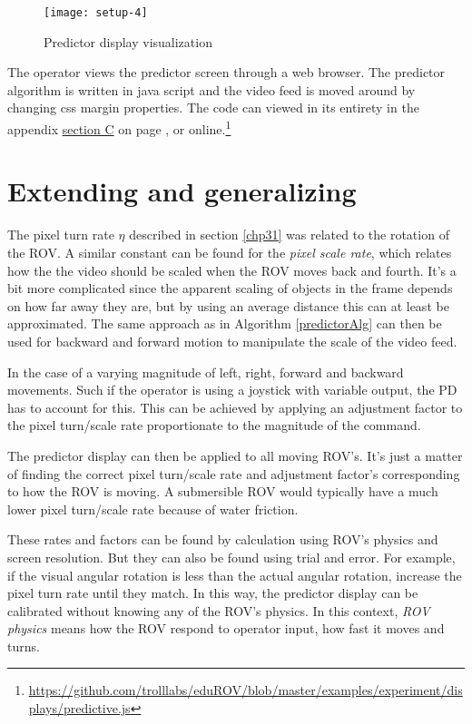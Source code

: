 \begin{figure}[h!]
    \centering
    \texttt{[image: setup-4]}
    \caption{Predictor display visualization}
    \label{predictorvis}
\end{figure}

\clearpage
\restoregeometry

The operator views the predictor screen through a web browser. The predictor algorithm is written in java script and the video feed is moved around by changing css margin properties. The code can viewed in its entirety in the appendix \hyperref[appPredict]{section C} on page \pageref{appPredict}, or online.\footnote{\url{https://github.com/trolllabs/eduROV/blob/master/examples/experiment/displays/predictive.js}}


\section{Extending and generalizing}\label{expand}

The pixel turn rate $\eta$ described in section \ref{chp31} was related to the rotation of the ROV. A similar constant can be found for the \emph{pixel scale rate}, which relates how the the video should be scaled when the ROV moves back and fourth. It's a bit more complicated since the apparent scaling of objects in the frame depends on how far away they are, but by using an average distance this can at least be approximated. The same approach as in Algorithm \ref{predictorAlg} can then be used for backward and forward motion to manipulate the scale of the video feed.

In the case of a varying magnitude of left, right, forward and backward movements. Such if the operator is using a joystick with variable output, the PD has to account for this. This can be achieved by applying an adjustment factor to the pixel turn/scale rate proportionate to the magnitude of the command.

The predictor display can then be applied to all moving ROV's. It's just a matter of finding the correct pixel turn/scale rate and adjustment factor's corresponding to how the ROV is moving. A submersible ROV would typically have a much lower pixel turn/scale rate because of water friction.

These rates and factors can be found by calculation using ROV's physics and screen resolution. But they can also be found using trial and error. For example, if the visual angular rotation is less than the actual angular rotation, increase the pixel turn rate until they match. In this way, the predictor display can be calibrated without knowing any of the ROV's physics. In this context, \emph{ROV physics} means how the ROV respond to operator input, how fast it moves and turns.